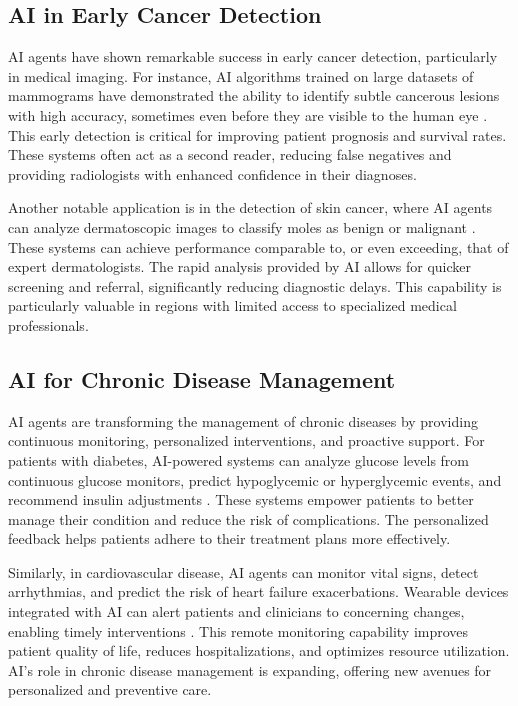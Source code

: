 \documentclass[12pt,a4paper]{article}
\begin{document}
\subsection{AI in Early Cancer Detection}
\label{subsec:cancer-detection}
AI agents have shown remarkable success in early cancer detection, particularly in medical imaging. For instance, AI algorithms trained on large datasets of mammograms have demonstrated the ability to identify subtle cancerous lesions with high accuracy, sometimes even before they are visible to the human eye \cite{mckinney2020international}. This early detection is critical for improving patient prognosis and survival rates. These systems often act as a second reader, reducing false negatives and providing radiologists with enhanced confidence in their diagnoses.

Another notable application is in the detection of skin cancer, where AI agents can analyze dermatoscopic images to classify moles as benign or malignant \cite{esteva2017dermatologist}. These systems can achieve performance comparable to, or even exceeding, that of expert dermatologists. The rapid analysis provided by AI allows for quicker screening and referral, significantly reducing diagnostic delays. This capability is particularly valuable in regions with limited access to specialized medical professionals.

\subsection{AI for Chronic Disease Management}
\label{subsec:chronic-disease-management}
AI agents are transforming the management of chronic diseases by providing continuous monitoring, personalized interventions, and proactive support. For patients with diabetes, AI-powered systems can analyze glucose levels from continuous glucose monitors, predict hypoglycemic or hyperglycemic events, and recommend insulin adjustments \cite{wang2019deep}. These systems empower patients to better manage their condition and reduce the risk of complications. The personalized feedback helps patients adhere to their treatment plans more effectively.

Similarly, in cardiovascular disease, AI agents can monitor vital signs, detect arrhythmias, and predict the risk of heart failure exacerbations. Wearable devices integrated with AI can alert patients and clinicians to concerning changes, enabling timely interventions \cite{nih_patient_outcomes}. This remote monitoring capability improves patient quality of life, reduces hospitalizations, and optimizes resource utilization. AI's role in chronic disease management is expanding, offering new avenues for personalized and preventive care.
\end{document}
